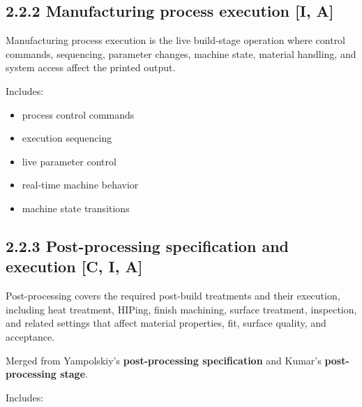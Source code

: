 \documentclass[10pt,a4paper,oneside]{report}
\begin{document}
\subsection{2.2.2 Manufacturing process execution [I, A]}


Manufacturing process execution is the live build-stage operation where control commands, sequencing, parameter changes, machine state, material handling, and system access affect the printed output.

Includes:

\begin{itemize}
\item process control commands
\item execution sequencing
\item live parameter control
\item real-time machine behavior
\item machine state transitions
\end{itemize}


\subsection{2.2.3 Post-processing specification and execution [C, I, A]}


Post-processing covers the required post-build treatments and their execution, including heat treatment, HIPing, finish machining, surface treatment, inspection, and related settings that affect material properties, fit, surface quality, and acceptance.

Merged from Yampolskiy's \textbf{post-processing specification} and Kumar's \textbf{post-processing stage}.

Includes:
\end{document}
